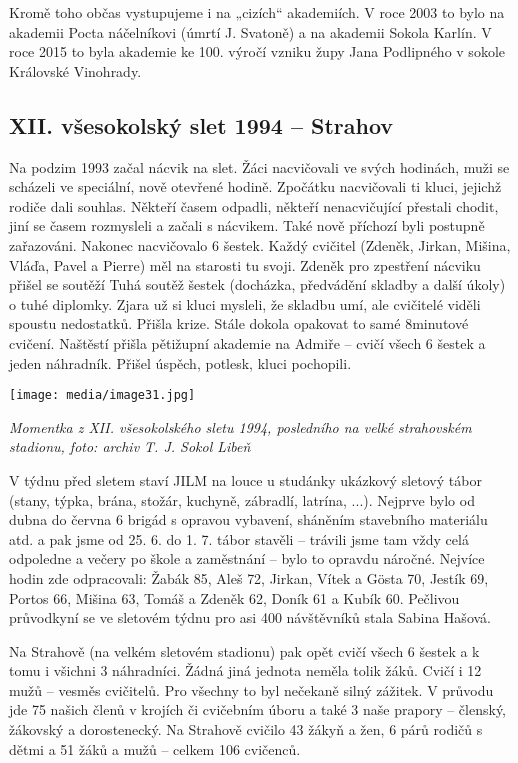 Kromě toho občas vystupujeme i na „cizích`` akademiích. V roce 2003 to
bylo na akademii Pocta náčelníkovi (úmrtí J. Svatoně) a na akademii
Sokola Karlín. V roce 2015 to byla akademie ke 100. výročí vzniku župy
Jana Podlipného v sokole Královské Vinohrady.

\subsection{XII. všesokolský slet 1994 --
Strahov}\label{xii.-vux161esokolskuxfd-slet-1994-strahov}

Na podzim 1993 začal nácvik na slet. Žáci nacvičovali ve svých hodinách,
muži se scházeli ve speciální, nově otevřené hodině. Zpočátku
nacvičovali ti kluci, jejichž rodiče dali souhlas. Někteří časem
odpadli, někteří nenacvičující přestali chodit, jiní se časem rozmysleli
a začali s nácvikem. Také nově příchozí byli postupně zařazováni.
Nakonec nacvičovalo 6 šestek. Každý cvičitel (Zdeněk, Jirkan, Mišina,
Vláďa, Pavel a Pierre) měl na starosti tu svoji. Zdeněk pro zpestření
nácviku přišel se soutěží Tuhá soutěž šestek (docházka, předvádění
skladby a další úkoly) o tuhé diplomky. Zjara už si kluci mysleli, že
skladbu umí, ale cvičitelé viděli spoustu nedostatků. Přišla krize.
Stále dokola opakovat to samé 8minutové cvičení. Naštěstí přišla
pětižupní akademie na Admiře -- cvičí všech 6 šestek a jeden náhradník.
Přišel úspěch, potlesk, kluci pochopili.

\texttt{[image: media/image31.jpg]}

\emph{Momentka z XII. všesokolského sletu 1994, posledního na velké
strahovském stadionu, foto: archiv T. J. Sokol Libeň}

V týdnu před sletem staví JILM na louce u studánky ukázkový sletový
tábor (stany, týpka, brána, stožár, kuchyně, zábradlí, latrína, ...).
Nejprve bylo od dubna do června 6 brigád s opravou vybavení, sháněním
stavebního materiálu atd. a pak jsme od 25. 6. do 1. 7. tábor stavěli --
trávili jsme tam vždy celá odpoledne a večery po škole a zaměstnání --
bylo to opravdu náročné. Nejvíce hodin zde odpracovali: Žabák 85, Aleš
72, Jirkan, Vítek a Gösta 70, Jestík 69, Portos 66, Mišina 63, Tomáš a
Zdeněk 62, Doník 61 a Kubík 60. Pečlivou průvodkyní se ve sletovém týdnu
pro asi 400 návštěvníků stala Sabina Hašová.

Na Strahově (na velkém sletovém stadionu) pak opět cvičí všech 6 šestek
a k tomu i všichni 3 náhradníci. Žádná jiná jednota neměla tolik žáků.
Cvičí i 12 mužů -- vesměs cvičitelů. Pro všechny to byl nečekaně silný
zážitek. V průvodu jde 75 našich členů v krojích či cvičebním úboru a
také 3 naše prapory -- členský, žákovský a dorostenecký. Na Strahově
cvičilo 43 žákyň a žen, 6 párů rodičů s dětmi a 51 žáků a mužů -- celkem
106 cvičenců.

